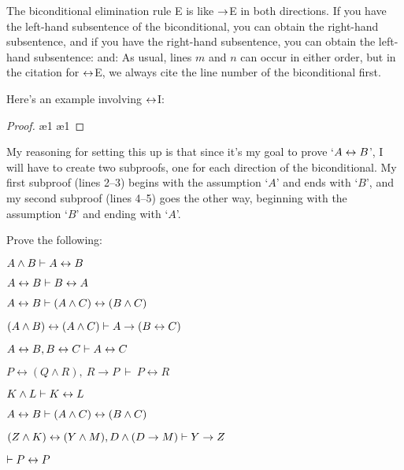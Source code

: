The biconditional elimination rule {\eiff}E is like $\rightarrow$E in both directions. If you have the left-hand subsentence of the biconditional, you can obtain the right-hand subsentence, and if you have the right-hand subsentence, you can obtain the left-hand subsentence:
and:
As usual, lines $m$ and $n$ can occur in either order, but in the citation for $\leftrightarrow$E, we always cite the line number of the biconditional first.

Here's an example involving $\leftrightarrow$I:


\begin{proof}
 
\open
{}  
 \ae{1}
\close
\open
{} 
 \ae{1}
\close
{} 
\end{proof}
My reasoning for setting this up is that since it's my goal to prove `$A \leftrightarrow B$', I will have to create two subproofs, one for each direction of the biconditional. My first subproof (lines 2--3) begins with the assumption `$A$' and ends with `$B$', and my second subproof (lines 4--5) goes the other way, beginning with the assumption `$B$' and ending with `$A$'.

\practiceproblems

\problempart
Prove the following:

\begin{earg}
\item $A \wedge B \vdash A \leftrightarrow B$
\item $A \leftrightarrow B \vdash B \leftrightarrow A$
\item $A \leftrightarrow B \vdash (A \wedge C) \leftrightarrow (B \wedge C)$
\item $(A \wedge B) \leftrightarrow (A \wedge C) \vdash A \rightarrow (B \leftrightarrow C)$
\item $A\leftrightarrow B, B\leftrightarrow C \vdash A\leftrightarrow C$
\item $P \leftrightarrow (Q \land R), \ R \rightarrow P  \ \vdash \ P \leftrightarrow R$
\item $K \wedge L \vdash K \leftrightarrow L$
\item $A \leftrightarrow B \vdash (A \wedge C) \leftrightarrow (B \wedge C)$
\item $(Z\wedge K)\leftrightarrow(Y\wedge M), D\wedge(D\rightarrow M) \vdash Y\rightarrow Z$
\item $\vdash P \leftrightarrow P$
\end{earg}





